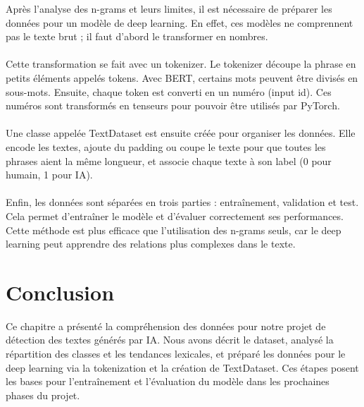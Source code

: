 Après l’analyse des n-grams et leurs limites, il est nécessaire de préparer les données pour un modèle de deep learning. En effet, ces modèles ne comprennent pas le texte brut ; il faut d’abord le transformer en nombres.
\\
\\
Cette transformation se fait avec un tokenizer. Le tokenizer découpe la phrase en petits éléments appelés tokens. Avec BERT, certains mots peuvent être divisés en sous-mots. Ensuite, chaque token est converti en un numéro (input id). Ces numéros sont transformés en tenseurs pour pouvoir être utilisés par PyTorch.
\\
\\
Une classe appelée TextDataset est ensuite créée pour organiser les données. Elle encode les textes, ajoute du padding ou coupe le texte pour que toutes les phrases aient la même longueur, et associe chaque texte à son label (0 pour humain, 1 pour IA).
\\
\\
Enfin, les données sont séparées en trois parties : entraînement, validation et test. Cela permet d’entraîner le modèle et d’évaluer correctement ses performances. Cette méthode est plus efficace que l’utilisation des n-grams seuls, car le deep learning peut apprendre des relations plus complexes dans le texte.




\section{Conclusion}
Ce chapitre a présenté la compréhension des données pour notre projet de détection des textes générés par IA. Nous avons décrit le dataset, analysé la répartition des classes et les tendances lexicales, et préparé les données pour le deep learning via la tokenization et la création de TextDataset. Ces étapes posent les bases pour l’entraînement et l’évaluation du modèle dans les prochaines phases du projet.